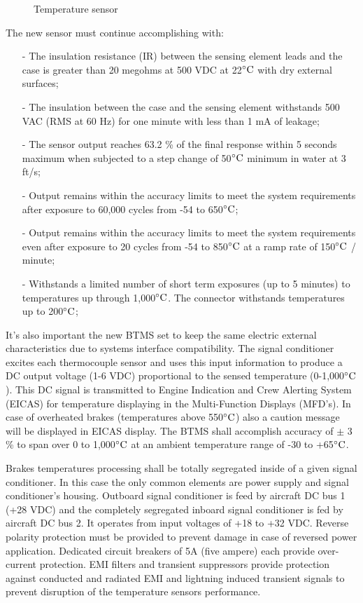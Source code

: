 \begin{figure}[H] %
    \caption{Temperature sensor}
    \label{fig:BTMSsensor}
\end{figure}


The new sensor must continue accomplishing with:
\begin{itemize}
\item[-]The insulation resistance (IR) between the sensing element leads and the case is greater than 20 megohms at 500 VDC at 22$\celsius$ with dry external surfaces;
\item[-]The insulation between the case and the sensing element withstands 500 VAC (RMS at 60 Hz) for one minute with less than 1 mA of leakage;
\item[-]The sensor output reaches 63.2 \% of the final response within 5 seconds maximum when subjected to a step change of 50$\celsius$ minimum in water at 3 ft/s;
\item[-]Output remains within the accuracy limits to meet the system requirements after exposure to 60,000 cycles from -54 to 650$\celsius$;
\item[-]Output remains within the accuracy limits to meet the system requirements even after exposure to 20 cycles from -54 to 850$\celsius$ at a ramp rate of 150$\celsius$ / minute;
\item[-]Withstands a limited number of short term exposures (up to 5 minutes) to temperatures up through 1,000$\celsius$. The connector withstands temperatures up to 200$\celsius$;
\end{itemize}

It's also important the new BTMS set to keep the same electric external characteristics due to systems interface compatibility. The signal conditioner excites each thermocouple sensor and uses this input information to produce a DC output voltage (1-6 VDC) proportional to the sensed temperature (0-1,000$\celsius$). This DC signal is transmitted to Engine Indication and Crew Alerting System (EICAS) for temperature displaying in the Multi-Function Displays (MFD's). In case of overheated brakes (temperatures above 550$\celsius$) also a caution message will be displayed in EICAS display. The BTMS shall accomplish accuracy of $\pm$ 3 \% to span over 0 to 1,000$\celsius$ at an ambient temperature range of -30 to +65$\celsius$.

Brakes temperatures processing shall be totally segregated inside of a given signal conditioner. In this case the only common elements are power supply and signal conditioner's housing. Outboard signal conditioner is feed by aircraft DC bus 1 (+28 VDC) and the completely segregated inboard signal conditioner is fed by aircraft DC bus 2. It operates from input voltages of +18 to +32 VDC. Reverse polarity protection must be provided to prevent damage in case of reversed power application. Dedicated circuit breakers of 5A (five ampere) each provide over-current protection. EMI filters and transient suppressors provide protection against conducted and radiated EMI and lightning induced transient signals to prevent disruption of the temperature sensors performance.

